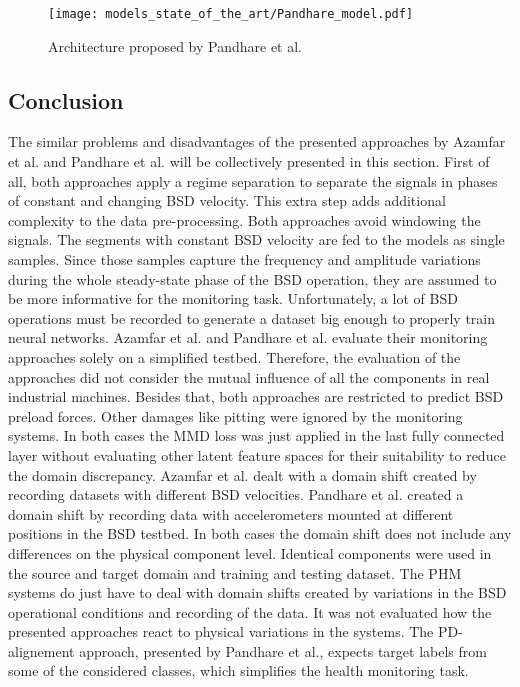 \begin{figure}[H]
  \centering
  \texttt{[image: models\_state\_of\_the\_art/Pandhare\_model.pdf]}
  \caption{Architecture proposed by Pandhare et al. \cite{Pandhare2021}}
  \label{fig:Pandhare_model}
\end{figure}

\subsection{Conclusion}
The similar problems and disadvantages of the presented approaches by Azamfar et al. \cite{AZAMFAR2020103932} and Pandhare et al. \cite{Pandhare2021} will be collectively presented in this section. First of all, both approaches apply a regime separation to separate the signals in phases of constant and changing BSD velocity. This extra step adds additional complexity to the data pre-processing. Both approaches avoid windowing the signals. The segments with constant BSD velocity are fed to the models as single samples. Since those samples capture the frequency and amplitude variations during the whole steady-state phase of the BSD operation, they are assumed to be more informative for the monitoring task. Unfortunately, a lot of BSD operations must be recorded to generate a dataset big enough to properly train neural networks. Azamfar et al. and  Pandhare et al. evaluate their monitoring approaches solely on a simplified testbed. Therefore, the evaluation of the approaches did not consider the mutual influence of all the components in real industrial machines. Besides that, both approaches are restricted to predict BSD preload forces. Other damages like pitting were ignored by the monitoring systems. In both cases the MMD loss was just applied in the last fully connected layer without evaluating other latent feature spaces for their suitability to reduce the domain discrepancy. Azamfar et al. dealt with a domain shift created by recording datasets with different BSD velocities. Pandhare et al. created a domain shift by recording data with accelerometers mounted at different positions in the BSD testbed. In both cases the domain shift does not include any differences on the physical component level. Identical components were used in the source and target domain and training and testing dataset. The PHM systems do just have to deal with domain shifts created by variations in the BSD operational conditions and recording of the data. It was not evaluated how the presented approaches react to physical variations in the systems. The PD-alignement approach, presented by Pandhare et al., expects target labels from some of the considered classes, which simplifies the health monitoring task.


